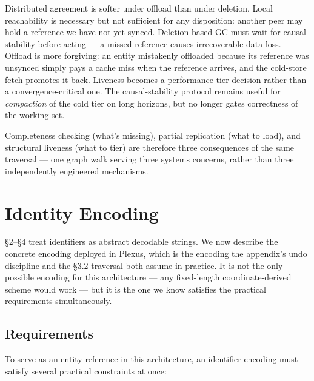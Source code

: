 Distributed agreement is softer under offload than under deletion. Local reachability is necessary but not sufficient for any disposition: another peer may hold a reference we have not yet synced. Deletion-based GC must wait for causal stability\cite{shapiro2011crdt} before acting --- a missed reference causes irrecoverable data loss. Offload is more forgiving: an entity mistakenly offloaded because its reference was unsynced simply pays a cache miss when the reference arrives, and the cold-store fetch promotes it back. Liveness becomes a performance-tier decision rather than a convergence-critical one. The causal-stability protocol remains useful for \emph{compaction} of the cold tier on long horizons, but no longer gates correctness of the working set.

Completeness checking (what's missing), partial replication (what to load), and structural liveness (what to tier) are therefore three consequences of the same traversal --- one graph walk serving three systems concerns, rather than three independently engineered mechanisms.

\section{Identity Encoding}

\S2--\S4 treat identifiers as abstract decodable strings. We now describe the concrete encoding deployed in Plexus, which is the encoding the appendix's undo discipline and the \S3.2 traversal both assume in practice. It is not the only possible encoding for this architecture --- any fixed-length coordinate-derived scheme would work --- but it is the one we know satisfies the practical requirements simultaneously.

\subsection{Requirements}

To serve as an entity reference in this architecture, an identifier encoding must satisfy several practical constraints at once:

